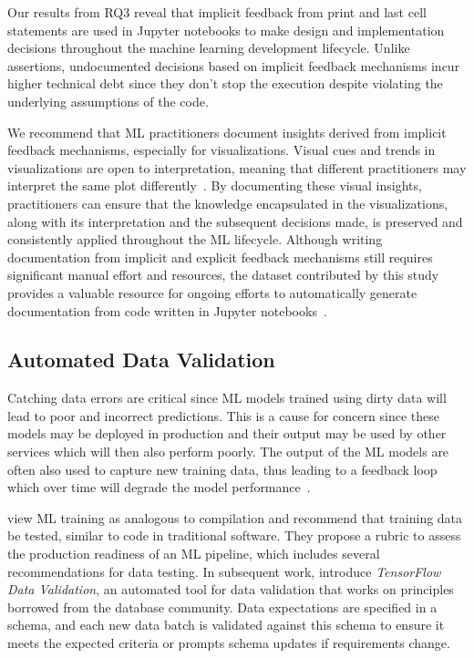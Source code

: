 \documentclass[smallextended]{svjour3}       %
\begin{document}
Our results from RQ3 reveal that implicit feedback from print and last cell statements are used in Jupyter notebooks to make design and implementation decisions throughout the machine learning development lifecycle. Unlike assertions, undocumented decisions based on implicit feedback mechanisms incur higher technical debt since they don't stop the execution despite violating the underlying assumptions of the code.

We recommend that ML practitioners document insights derived from implicit feedback mechanisms, especially for visualizations. Visual cues and trends in visualizations are open to interpretation, meaning that different practitioners may interpret the same plot differently~\citep{heer2010tour}. By documenting these visual insights, practitioners can ensure that the knowledge encapsulated in the visualizations, along with its interpretation and the subsequent decisions made, is preserved and consistently applied throughout the ML lifecycle. Although writing documentation from implicit and explicit feedback mechanisms still requires significant manual effort and resources, the dataset contributed by this study provides a valuable resource for ongoing efforts to automatically generate documentation from code written in Jupyter notebooks~\citep{yang2021subtle}.

\subsection{Automated Data Validation}

Catching data errors are critical since ML models trained using dirty data will lead to poor and incorrect predictions. This is a cause for concern since these models may be deployed in production and their output may be used by other services which will then also perform poorly. The output of the ML models are often also used to capture new training data, thus leading to a feedback loop which over time will degrade the model performance~\citep{sculley2015hidden,breck2019data}.

\citet{breck2017ml} view ML training as analogous to compilation and recommend that training data be tested, similar to code in traditional software. They propose a rubric to assess the production readiness of an ML pipeline, which includes several recommendations for data testing. In subsequent work, \citet{breck2019data} introduce \emph{TensorFlow Data Validation}, an automated tool for data validation that works on principles borrowed from the database community. Data expectations are specified in a schema, and each new data batch is validated against this schema to ensure it meets the expected criteria or prompts schema updates if requirements change.
\end{document}
